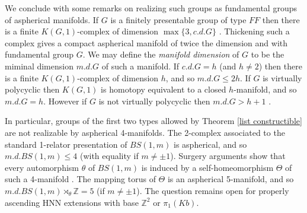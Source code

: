 \documentclass[12pt]{amsart}
\renewcommand{\leq}{\leqslant}
\begin{document}
We conclude with some remarks on realizing such groups 
as fundamental groups of aspherical manifolds.
If $G$ is a finitely presentable group of type $FF$ then there is
a finite $K(G,1)$-complex of dimension $\max\{3,c.d.G\}$
\cite{Wall}.
Thickening such a complex gives a compact aspherical manifold 
of twice the dimension and with fundamental group $G$.
We may define the {\it manifold dimension\/} of $G$ to be 
the miminal dimension $m.d.G$ of such a manifold.
If $c.d.G=h$ (and $h\not=2$) then there is a finite $K(G,1)$-complex of
dimension $h$, and so $m.d.G\leq2h$.
If $G$ is virtually polycyclic then $K(G,1)$ is homotopy equivalent 
to a closed $h$-manifold, and so $m.d.G=h$.
However if $G$ is not virtually polycyclic then $m.d.G>h+1$
\cite{DH22}.

In particular, 
groups of the first two types allowed by Theorem \ref{list constructible}
are not realizable by aspherical 4-manifolds.
The 2-complex associated to the standard 1-relator presentation of $BS(1,m)$ is aspherical, and so $m.d.BS(1,m)\leq4$ (with equality if $m\not=\pm1$).
Surgery arguments show that every automorphism $\theta$ of $BS(1,m)$ 
is induced by a self-homeomorphism $\Theta$ of such a 4-manifold \cite{DH22}.
The mapping torus of $\Theta$ is an aspherical 5-manifold,
and so $m.d.{BS(1,m)}\rtimes_\theta\mathbb{Z}=5$ (if $m\not=\pm1$).
The question remains open for properly ascending HNN extensions with base
$\mathbb{Z}^2$ or $\pi_1(Kb)$.
\end{document}
